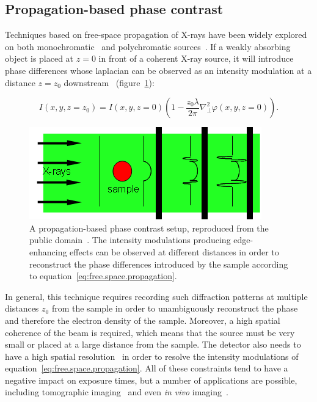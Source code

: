 \subsection{Propagation-based phase contrast}
Techniques based on free-space propagation of X-rays have been widely
explored on both monochromatic~\parencite{1995RScI...66.5486S,Cloetens1996}
and polychromatic sources~\parencite{Wilkins1996}. If a weakly
absorbing object is placed at $z=0$ in front of a coherent X-ray source,
it will introduce phase differences whose laplacian can be observed as an
intensity modulation at a distance $z=z_0$
downstream~\parencite{Paganin2006b-propagation-based}
(figure~\ref{fig:propagation.based}):

\begin{equation}
    I(x, y, z = z_0) = I(x, y, z=0)\left(1 - \frac{z_0\lambda}{2\pi}\nabla_\perp^2
    \varphi(x, y, z=0)\right).
    \label{eq:free.space.propagation}
\end{equation}

\begin{figure}[htb]
    \centering
    \includegraphics[width=.7\textwidth]{gfx/propagation-based_imaging.png}
    \caption[Propagation-based setup.]{A propagation-based phase contrast
        setup, reproduced from the public domain~\parencite{propagation-based-picture}. The intensity modulations producing edge-enhancing effects can
be observed at different distances in order to reconstruct the phase
differences introduced by the sample according to
equation~\eqref{eq:free.space.propagation}.}
    \label{fig:propagation.based}
\end{figure}

In general, this technique requires recording such diffraction patterns at
multiple distances $z_0$ from the sample in order to unambiguously
reconstruct the phase and therefore the electron density of the sample.
Moreover, a high spatial coherence of the beam is required, which means
that the source must be very small or placed at a large distance from
the sample. The detector also needs to have a high spatial
resolution~\parencite{Pogany1997,2005RScI...76i3706N,2008OExpr..16.3223G} in
order to resolve the intensity modulations of
equation~\eqref{eq:free.space.propagation}. All of these constraints tend to
have a negative impact on exposure times, but a number of applications are
possible, including tomographic
imaging~\parencite{1997JAP....81.5878C,2009RScI...80e6101B,2012PLoSO...735691L}
and even \emph{in vivo} imaging~\parencite{2007NIMPA.572..237C}.

